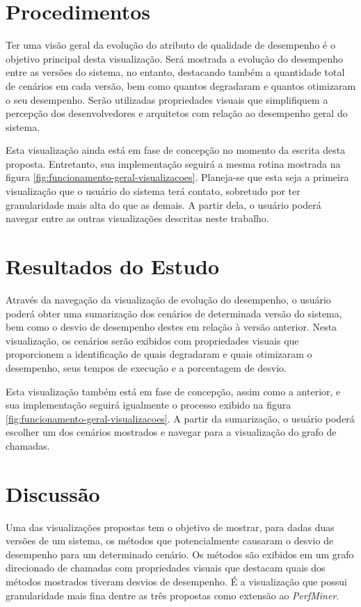 \section{Procedimentos} \label{sec:procedimentos}

Ter uma visão geral da evolução do atributo de qualidade de desempenho é o objetivo principal desta visualização. Será mostrada a evolução do desempenho entre as versões do sistema, no entanto, destacando também a quantidade total de cenários em cada versão, bem como quantos degradaram e quantos otimizaram o seu desempenho. Serão utilizadas propriedades visuais que simplifiquem a percepção dos desenvolvedores e arquitetos com relação ao desempenho geral do sistema.

Esta visualização ainda está em fase de concepção no momento da escrita desta proposta. Entretanto, sua implementação seguirá a mesma rotina mostrada na figura \ref{fig:funcionamento-geral-visualizacoes}. Planeja-se que esta seja a primeira visualização que o usuário do sistema terá contato, sobretudo por ter granularidade mais alta do que as demais. A partir dela, o usuário poderá navegar entre as outras visualizações descritas neste trabalho.

\section{Resultados do Estudo} \label{sec:resultados}

Através da navegação da visualização de evolução do desempenho, o usuário poderá obter uma sumarização dos cenários de determinada versão do sistema, bem como o desvio de desempenho destes em relação à versão anterior. Nesta visualização, os cenários serão exibidos com propriedades visuais que proporcionem a identificação de quais degradaram e quais otimizaram o desempenho, seus tempos de execução e a porcentagem de desvio.

Esta visualização também está em fase de concepção, assim como a anterior, e sua implementação seguirá igualmente o processo exibido na figura \ref{fig:funcionamento-geral-visualizacoes}. A partir da sumarização, o usuário poderá escolher um dos cenários mostrados e navegar para a visualização do grafo de chamadas.

\section{Discussão} \label{sec:discussao}

Uma das visualizações propostas tem o objetivo de mostrar, para dadas duas versões de um sistema, os métodos que potencialmente causaram o desvio de desempenho para um determinado cenário. Os métodos são exibidos em um grafo direcionado de chamadas com propriedades visuais que destacam quais dos métodos mostrados tiveram desvios de desempenho. É a visualização que possui granularidade mais fina dentre as três propostas como extensão ao \textit{PerfMiner}.

